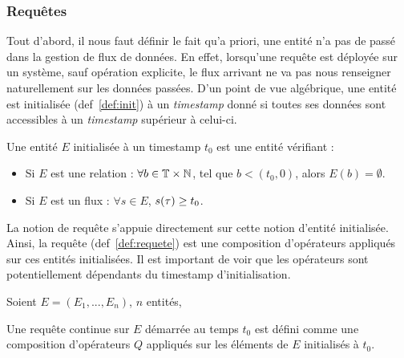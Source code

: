 \subsubsection{Requêtes}
Tout d'abord, il nous faut définir le fait qu'a priori, une entité n'a pas de passé dans la gestion de flux de données. En effet, lorsqu'une requête est déployée sur un système, sauf opération explicite, le flux arrivant ne va pas nous renseigner naturellement sur les données passées. D'un point de vue algébrique, une entité est initialisée (def~\ref{def:init}) à un \textit{timestamp} donné si toutes ses données sont accessibles à un \textit{timestamp} supérieur à celui-ci.
\begin{defi}\label{def:init}
	Une entité $E$ initialisée à un timestamp $t_0$ est une entité vérifiant :
	\begin{itemize}
		\item Si $E$ est une relation : $\forall b \in \mathbb{T}\times\mathbb{N}$, tel que $b<(t_0,0)$, alors $E(b) = \emptyset$.
		\item Si $E$ est un flux : $\forall s\in E$, $s(\tau) \geq t_0$.
	\end{itemize}
\end{defi}

La notion de requête s'appuie directement sur cette notion d'entité initialisée. Ainsi, la requête (def~\ref{def:requete}) est une composition d'opérateurs appliqués sur ces entités initialisées. Il est important de voir que les opérateurs sont potentiellement dépendants du timestamp d'initialisation.
\begin{defi}[Requête]\label{def:requete}
	Soient $E=(E_1, ..., E_n)$, $n$ entités,
	
	Une requête continue sur $E$ démarrée au temps $t_0$ est défini comme une composition d'opérateurs $Q$ appliqués sur les éléments de $E$ initialisés à $t_0$.
\end{defi}


